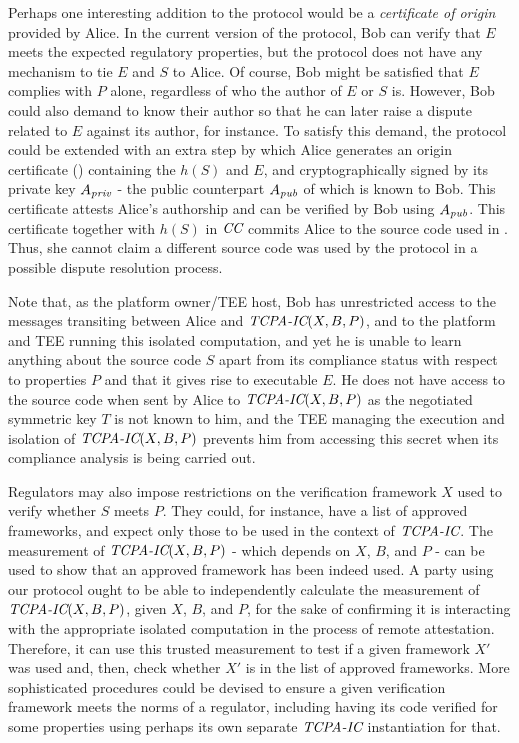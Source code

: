 Perhaps one interesting addition to the protocol would be a \emph{certificate of origin} provided by Alice. In the current version of the protocol, Bob can verify that $E$ meets the expected regulatory properties, but the protocol does not have any mechanism to tie $E$ and $S$ to Alice. Of course, Bob might be satisfied that $E$ complies with $P$ alone, regardless of who the author of $E$ or $S$ is. However, Bob could also demand to know their author so that he can later raise a dispute related to $E$ against its author, for instance. To satisfy this demand, the protocol could be extended with an extra step by which Alice generates an origin certificate (\OC{}) containing the $h(S)$ and $E$, and cryptographically signed by its private key $A_{\textit{priv}{}}$ - the public counterpart $A_{\textit{pub}{}}$ of which is known to Bob. This certificate attests Alice's authorship and can be verified by Bob using $A_{\textit{pub}{}}$. This certificate together with $h(S)$ in $\textit{CC}{}$ commits Alice to the source code used in \tcpa. Thus, she cannot claim a different source code was used by the protocol in a possible dispute resolution process.

Note that, as the platform owner/TEE host, Bob has unrestricted access to the messages transiting between Alice and $\textit{TCPA-IC}{}(X,B,P)$, and to the platform and TEE running this isolated computation, and yet he is unable to learn anything about the source code $S$ apart from its compliance status with respect to properties $P$ and that it gives rise to executable $E$. He does not have access to the source code when sent by Alice to $\textit{TCPA-IC}{}(X,B,P)$ as the negotiated symmetric key $T$ is not known to him, and the TEE managing the execution and isolation of $\textit{TCPA-IC}{}(X,B,P)$ prevents him from accessing this secret when its compliance analysis is being carried out.

Regulators may also impose restrictions on the verification framework $X$ used to verify whether $S$ meets $P$. They could, for instance, have a list of approved frameworks, and expect only those to be used in the context of $\textit{TCPA-IC}{}$. The measurement of $\textit{TCPA-IC}{}(X,B,P)$ - which depends on $X$, $B$, and $P$ - can be used to show that an approved framework has been indeed used. A party using our protocol ought to be able to independently calculate the measurement of $\textit{TCPA-IC}{}(X,B,P)$, given $X$, $B$, and $P$, for the sake of confirming it is interacting with the appropriate isolated computation in the process of remote attestation. Therefore, it can use this trusted measurement to test if a given framework $X'$ was used and, then, check whether $X'$ is in the list of approved frameworks. More sophisticated procedures could be devised to ensure a given verification framework meets the norms of a regulator, including having its code verified for some properties using perhaps its own separate $\textit{TCPA-IC}{}$ instantiation for that.

